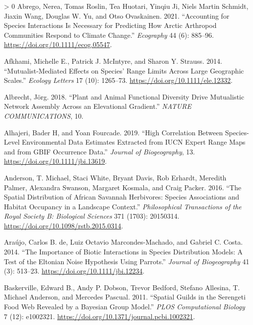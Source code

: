 \documentclass[10pt,oneside]{article}
\newlength{\cslhangindent}
\newenvironment{CSLReferences}[3] %
 {%
  \setlength{\parindent}{0pt}
  \ifodd #1 \everypar{\setlength{\hangindent}{\cslhangindent}}\ignorespaces\fi
  \ifnum #2 > 0
  \setlength{\parskip}{#2\baselineskip}
  \fi
 }%
 {}
\begin{document}
\hypertarget{refs}{}
\begin{CSLReferences}{1}{0}
\leavevmode\hypertarget{ref-Abrego2021AccSpe}{}%
Abrego, Nerea, Tomas Roslin, Tea Huotari, Yinqiu Ji, Niels Martin
Schmidt, Jiaxin Wang, Douglas W. Yu, and Otso Ovaskainen. 2021.
{``Accounting for Species Interactions Is Necessary for Predicting How
Arctic Arthropod Communities Respond to Climate Change.''}
\emph{Ecography} 44 (6): 885--96.
\url{https://doi.org/10.1111/ecog.05547}.

\leavevmode\hypertarget{ref-Afkhami2014MutEff}{}%
Afkhami, Michelle E., Patrick J. McIntyre, and Sharon Y. Strauss. 2014.
{``Mutualist-Mediated Effects on Species' Range Limits Across Large
Geographic Scales.''} \emph{Ecology Letters} 17 (10): 1265--73.
\url{https://doi.org/10.1111/ele.12332}.

\leavevmode\hypertarget{ref-Albrecht2018PlaAni}{}%
Albrecht, Jörg. 2018. {``Plant and Animal Functional Diversity Drive
Mutualistic Network Assembly Across an Elevational Gradient.''}
\emph{NATURE COMMUNICATIONS}, 10.

\leavevmode\hypertarget{ref-Alhajeri2019HigCor}{}%
Alhajeri, Bader H, and Yoan Fourcade. 2019. {``High Correlation Between
Species-Level Environmental Data Estimates Extracted from IUCN Expert
Range Maps and from GBIF Occurrence Data.''} \emph{Journal of
Biogeography}, 13. \url{https://doi.org/10.1111/jbi.13619}.

\leavevmode\hypertarget{ref-Anderson2016SpaDis}{}%
Anderson, T. Michael, Staci White, Bryant Davis, Rob Erhardt, Meredith
Palmer, Alexandra Swanson, Margaret Kosmala, and Craig Packer. 2016.
{``The Spatial Distribution of African Savannah Herbivores: Species
Associations and Habitat Occupancy in a Landscape Context.''}
\emph{Philosophical Transactions of the Royal Society B: Biological
Sciences} 371 (1703): 20150314.
\url{https://doi.org/10.1098/rstb.2015.0314}.

\leavevmode\hypertarget{ref-Araujo2014ImpBio}{}%
Araújo, Carlos B. de, Luiz Octavio Marcondes-Machado, and Gabriel C.
Costa. 2014. {``The Importance of Biotic Interactions in Species
Distribution Models: A Test of the Eltonian Noise Hypothesis Using
Parrots.''} \emph{Journal of Biogeography} 41 (3): 513--23.
\url{https://doi.org/10.1111/jbi.12234}.

\leavevmode\hypertarget{ref-Baskerville2011SpaGui}{}%
Baskerville, Edward B., Andy P. Dobson, Trevor Bedford, Stefano
Allesina, T. Michael Anderson, and Mercedes Pascual. 2011. {``Spatial
Guilds in the Serengeti Food Web Revealed by a Bayesian Group Model.''}
\emph{PLOS Computational Biology} 7 (12): e1002321.
\url{https://doi.org/10.1371/journal.pcbi.1002321}.


\end{CSLReferences}
\end{document}
